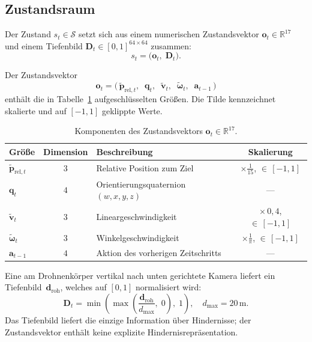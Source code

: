 \subsection{Zustandsraum}
\label{subsec:meth_zustandsraum}

Der Zustand $s_t \in \mathcal{S}$ setzt sich aus einem numerischen
Zustandsvektor $\mathbf{o}_t \in \mathbb{R}^{17}$ und einem Tiefenbild
$\mathbf{D}_t \in [0,1]^{64 \times 64}$ zusammen:
\begin{equation} \label{eq:meth_state}
  s_t = \bigl(\mathbf{o}_t,\;\mathbf{D}_t\bigr).
\end{equation}

Der Zustandsvektor
\begin{equation} \label{eq:meth_obs_vector}
  \mathbf{o}_t = \bigl(\,\tilde{\mathbf{p}}_{\mathrm{rel},t},\;\;
  \mathbf{q}_t,\;\;
  \tilde{\mathbf{v}}_t,\;\;
  \tilde{\boldsymbol{\omega}}_t,\;\;
  \mathbf{a}_{t-1}\,\bigr)
\end{equation}
enthält die in Tabelle~\ref{tab:meth_obs} aufgeschlüsselten Größen.
Die Tilde kennzeichnet skalierte und auf $[-1,1]$ geklippte Werte.

\begin{table}[ht]
\centering
\caption[Komponenten des Zustandsvektors]{Komponenten des Zustandsvektors $\mathbf{o}_t \in \mathbb{R}^{17}$.}
\label{tab:meth_obs}
\small
\begin{tabular}{l c l c}
\toprule
\textbf{Größe} & \textbf{Dimension} & \textbf{Beschreibung} & \textbf{Skalierung} \\
\midrule
$\tilde{\mathbf{p}}_{\mathrm{rel},t}$ & $3$ & Relative Position zum Ziel
  & $\times\tfrac{1}{15}$, ${\in}\,[-1,1]$ \\[2pt]
$\mathbf{q}_t$ & $4$ & Orientierungsquaternion $(w,x,y,z)$ & --- \\[2pt]
$\tilde{\mathbf{v}}_t$ & $3$ & Lineargeschwindigkeit
  & $\times\,0{,}4$, ${\in}\,[-1,1]$ \\[2pt]
$\tilde{\boldsymbol{\omega}}_t$ & $3$ & Winkelgeschwindigkeit
  & $\times\tfrac{1}{\pi}$, ${\in}\,[-1,1]$ \\[2pt]
$\mathbf{a}_{t-1}$ & $4$ & Aktion des vorherigen Zeitschritts & --- \\
\bottomrule
\end{tabular}
\end{table}

Eine am Drohnenkörper vertikal nach unten gerichtete Kamera liefert
ein Tiefenbild~$\mathbf{d}_{\mathrm{roh}}$, welches auf $[0,1]$
normalisiert wird:
\begin{equation} \label{eq:meth_depth}
  \mathbf{D}_t = \min\!\left(\max\!\left(\frac{\mathbf{d}_{\mathrm{roh}}}{d_{\max}},
  \; 0\right),\; 1\right), \quad d_{\max} = 20\,\text{m}.
\end{equation}
Das Tiefenbild liefert die einzige Information über Hindernisse; der
Zustandsvektor enthält keine explizite Hindernisrepräsentation.

